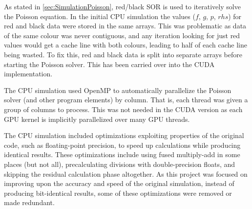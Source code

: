 As stated in \cref{sec:SimulationPoisson}, red/black SOR is used to iteratively solve the Poisson equation.
In the initial CPU simulation the values ($f$, $g$, $p$, $rhs$) for red and black data were stored in the same arrays.
This was problematic as data of the same colour was never contiguous, and any iteration looking for just red values would get a cache line with both colours, leading to half of each cache line being wasted.
To fix this, red and black data is split into separate arrays before starting the Poisson solver.
This has been carried over into the CUDA implementation.

The CPU simulation used OpenMP\cite{OpenMPHomeOpenMP} to automatically parallelize the Poisson solver (and other program elements) by column.
That is, each thread was given a group of columns to process.
This was not needed in the CUDA version as each GPU kernel is implicitly parallelized over many GPU threads.

The CPU simulation included optimizations exploiting properties of the original code, such as floating-point precision, to speed up calculations while producing identical results.
These optimizations include using fused multiply-add\cite{Muller2010TheInstruction} in some places (but not all), precalculating divisions with double-precision floats, and skipping the residual calculation phase altogether.
As this project was focused on improving upon the accuracy and speed of the original simulation, instead of producing bit-identical results, some of these optimizations were removed or made redundant.




